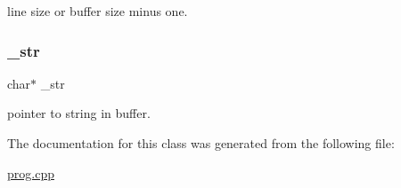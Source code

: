 line size or buffer size minus one. 

\mbox{\label{classmessage_a2606729876d9435e492e52b9ffca7968}} 
\subsubsection{\texorpdfstring{\+\_\+str}{\_str}}
{\footnotesize\ttfamily char$\ast$ \+\_\+str}



pointer to string in buffer. 



The documentation for this class was generated from the following file\+:\begin{DoxyCompactItemize}
\item 
\hyperlink{prog_8cpp}{prog.\+cpp}\end{DoxyCompactItemize}
